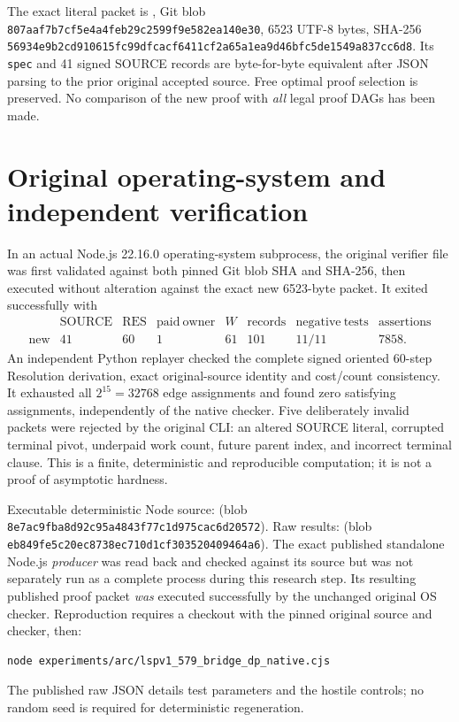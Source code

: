 \documentclass[11pt]{article}
\begin{document}
The exact literal packet is
,
Git blob \texttt{807aaf7b7cf5e4a4feb29c2599f9e582ea140e30},
6523 UTF-8 bytes, SHA-256
\texttt{56934e9b2cd910615fc99dfcacf6411cf2a65a1ea9d46bfc5de1549a837cc6d8}.
Its \texttt{spec} and 41 signed SOURCE records are byte-for-byte equivalent after JSON parsing to the prior original accepted source. Free optimal proof selection is preserved. No comparison of the new proof with \emph{all} legal proof DAGs has been made.

\section*{Original operating-system and independent verification}
In an actual Node.js 22.16.0 operating-system subprocess, the original verifier file was first validated against both pinned Git blob SHA and SHA-256, then executed without alteration against the exact new 6523-byte packet. It exited successfully with
\[
\begin{array}{c|ccccccc}
 & \mathrm{SOURCE} & \mathrm{RES} & \mathrm{paid\ owner} & W & \mathrm{records}
 & \mathrm{negative\ tests} & \mathrm{assertions}\\ \hline
\mathrm{new} &41&60&1&61&101&11/11&7858.
\end{array}
\]
An independent Python replayer checked the complete signed oriented 60-step Resolution derivation, exact original-source identity and cost/count consistency. It exhausted all $2^{15}=32768$ edge assignments and found zero satisfying assignments, independently of the native checker. Five deliberately invalid packets were rejected by the original CLI: an altered SOURCE literal, corrupted terminal pivot, underpaid work count, future parent index, and incorrect terminal clause. This is a finite, deterministic and reproducible computation; it is not a proof of asymptotic hardness.

Executable deterministic Node source:
(blob \texttt{8e7ac9fba8d92c95a4843f77c1d975cac6d20572}).
Raw results:
(blob \texttt{eb849fe5c20ec8738ec710d1cf303520409464a6}).
The exact published standalone Node.js \emph{producer} was read back and checked against its source but was not separately run as a complete process during this research step. Its resulting published proof packet \emph{was} executed successfully by the unchanged original OS checker. Reproduction requires a checkout with the pinned original source and checker, then:
\begin{verbatim}
node experiments/arc/lspv1_579_bridge_dp_native.cjs
\end{verbatim}
The published raw JSON details test parameters and the hostile controls; no random seed is required for deterministic regeneration.
\end{document}
